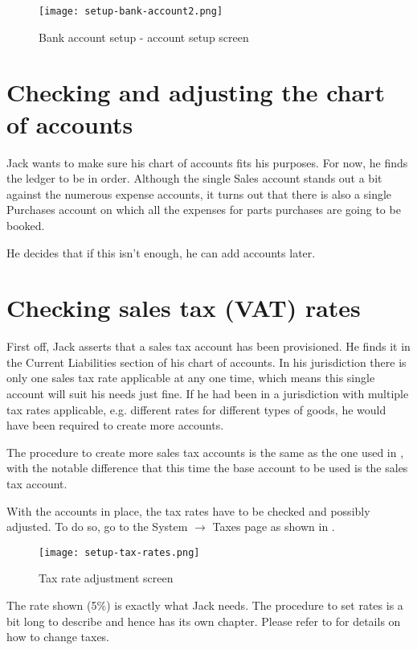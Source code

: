 \begin{figure}[h]
\texttt{[image: setup-bank-account2.png]}
\caption{Bank account setup - account setup screen}
\label{fig:bank-setup2}
\end{figure}


\section{Checking and adjusting the chart of accounts}

Jack wants to make sure his chart of accounts fits his purposes. For now, he finds
the ledger to be in order. Although the single Sales account stands out a bit against
the numerous expense accounts, it turns out that there is also a single Purchases
account on which all the expenses for parts purchases are going to be booked.

He decides that if this isn't enough, he can add accounts later.

\section{Checking sales tax (VAT) rates}

First off, Jack asserts that a sales tax account has been provisioned. He finds it
in the Current Liabilities section of his chart of accounts. In his jurisdiction there
is only one sales tax rate applicable at any one time, which means this single account
will suit his needs just fine. If he had been in a jurisdiction with multiple tax rates
applicable, e.g. different rates for different types of goods, he would have been
required to create more accounts.

The procedure to create more sales tax accounts is the same as the one used in
, with the notable difference that this time the base account
to be used is the sales tax account.

With the accounts in place, the tax rates have to be checked and possibly adjusted.
To do so, go to the System $\rightarrow$ Taxes page as shown in .

\begin{figure}[h]
\texttt{[image: setup-tax-rates.png]}
\caption{Tax rate adjustment screen}
\label{fig:setup-tax-rates}
\end{figure}

The rate shown (5\%) is exactly what Jack needs. The procedure to set rates is a bit
long to describe and hence has its own chapter. Please refer to  for
details on how to change taxes.

